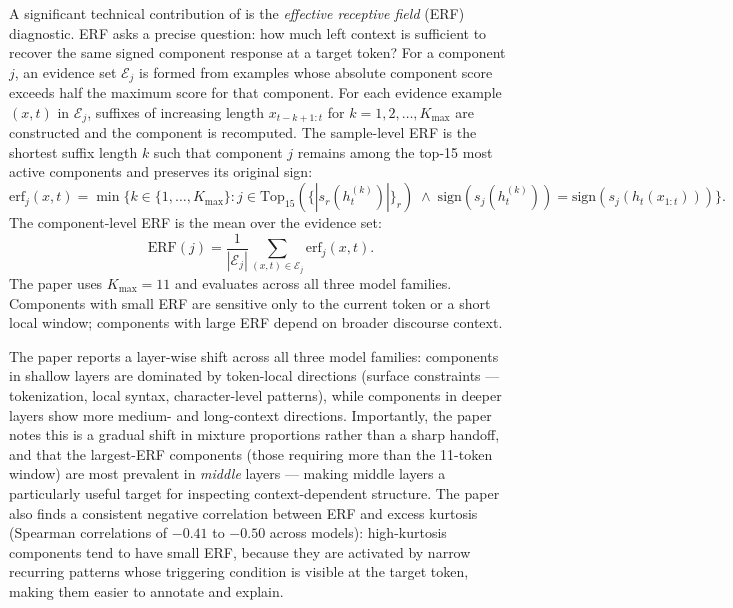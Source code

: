 \documentclass[12pt, a4paper]{article}
\theoremstyle{plain}
\theoremstyle{definition}
\theoremstyle{remark}
\newcommand{\ERF}{\mathrm{ERF}}
\begin{document}
A significant technical contribution of \cite{liu2026icalens} is the
\emph{effective receptive field} (ERF) diagnostic. ERF asks a precise
question: how much left context is sufficient to recover the same signed
component response at a target token? For a component $j$, an evidence set
$\mathcal{E}_j$ is formed from examples whose absolute component score
exceeds half the maximum score for that component. For each evidence example
$(x, t)$ in $\mathcal{E}_j$, suffixes of increasing length
$x_{t-k+1:t}$ for $k = 1, 2, \ldots, K_{\max}$ are constructed and the
component is recomputed. The sample-level ERF is the shortest suffix length
$k$ such that component $j$ remains among the top-15 most active components
and preserves its original sign:
\begin{equation}
  \mathrm{erf}_j(x, t) = \min\{k \in \{1, \ldots, K_{\max}\} :
  j \in \mathrm{Top}_{15}\!\left(\bigl\{|s_r(h_t^{(k)})|\bigr\}_r\right)
  \;\wedge\;
  \mathrm{sign}(s_j(h_t^{(k)})) = \mathrm{sign}(s_j(h_t(x_{1:t})))\}.
\end{equation}
The component-level ERF is the mean over the evidence set:
\begin{equation}
  \ERF(j) = \frac{1}{|\mathcal{E}_j|}
  \sum_{(x,t) \in \mathcal{E}_j} \mathrm{erf}_j(x, t).
\end{equation}
The paper uses $K_{\max} = 11$ and evaluates across all three model families.
Components with small ERF are sensitive only to the current token or a short
local window; components with large ERF depend on broader discourse context.

The paper reports a layer-wise shift across all three model families:
components in shallow layers are dominated by token-local directions
(surface constraints --- tokenization, local syntax, character-level
patterns), while components in deeper layers show more medium- and
long-context directions. Importantly, the paper notes this is a gradual
shift in mixture proportions rather than a sharp handoff, and that the
largest-ERF components (those requiring more than the 11-token window)
are most prevalent in \emph{middle} layers --- making middle layers a
particularly useful target for inspecting context-dependent structure.
The paper also finds a consistent negative correlation between ERF and
excess kurtosis (Spearman correlations of $-0.41$ to $-0.50$ across
models): high-kurtosis components tend to have small ERF, because they
are activated by narrow recurring patterns whose triggering condition is
visible at the target token, making them easier to annotate and explain.
\end{document}
